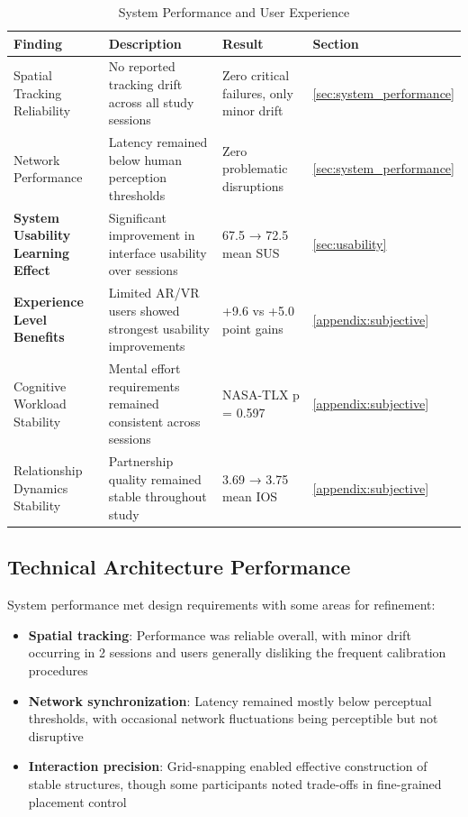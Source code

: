 \begin{table}[!t]
\centering
\caption{System Performance and User Experience}
\label{tab:system_experience_summary}
\begin{tabular}{@{}p{3.2cm}p{5.5cm}p{3.2cm}p{2.3cm}@{}}
\toprule
\textbf{Finding} & \textbf{Description} & \textbf{Result} & \textbf{Section} \\
\midrule
Spatial Tracking Reliability & No reported tracking drift across all study sessions & Zero critical failures, only minor drift & \ref{sec:system_performance} \\
Network Performance & Latency remained below human perception thresholds & Zero problematic disruptions & \ref{sec:system_performance} \\
\textbf{System Usability Learning Effect} & Significant improvement in interface usability over sessions & 67.5 → 72.5 mean SUS & \ref{sec:usability} \\
\textbf{Experience Level Benefits} & Limited AR/VR users showed strongest usability improvements & +9.6 vs +5.0 point gains & \ref{appendix:subjective} \\
Cognitive Workload Stability & Mental effort requirements remained consistent across sessions & NASA-TLX p = 0.597 & \ref{appendix:subjective} \\
Relationship Dynamics Stability & Partnership quality remained stable throughout study & 3.69 → 3.75 mean IOS & \ref{appendix:subjective} \\
\bottomrule
\end{tabular}
\end{table}

\subsection{Technical Architecture Performance}

System performance met design requirements with some areas for refinement:
\begin{itemize}
\item \textbf{Spatial tracking}: Performance was reliable overall, with minor drift occurring in 2 sessions and users generally disliking the frequent calibration procedures
\item \textbf{Network synchronization}: Latency remained mostly below perceptual thresholds, with occasional network fluctuations being perceptible but not disruptive
\item \textbf{Interaction precision}: Grid-snapping enabled effective construction of stable structures, though some participants noted trade-offs in fine-grained placement control
\end{itemize}

